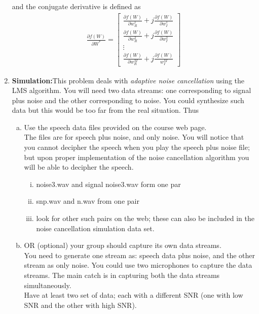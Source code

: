 \documentclass[journal,12pt,onecolumn]{IEEEtran}
\begin{document}
\begin{enumerate}
and the conjugate derivative is defined as\\
\begin{align*}
\frac{\partial{f(W)}}{\partial{W}^{*}}=\begin{bmatrix}{\frac{\partial{f(W)}}{\partial{w}_R^1}}+{j\frac{\partial{f(W)}}{\partial{w}_I^1}} \\[12pt]
{\frac{\partial{f(W)}}{\partial{w}_R^2}}+{j\frac{\partial{f(W)}}{\partial{w}_I^2}} \\
\vdots \\
{\frac{\partial{f(W)}}{\partial{w}_R^M}}+{j\frac{\partial{f(W)}}{{w}_I^M}}
\end{bmatrix}
\end{align*}
\bigskip
\item \textbf{Simulation:}This problem deals with \textit{adaptive noise cancellation} using the LMS algorithm. You will need two data streams: one corresponding to signal plus noise and the other corresponding to noise. You could synthesize such
data but this would be too far from the real situation. Thus
\medskip
\begin{enumerate}[(a)]
\item Use the speech data files provided on the course web page.\\
\smallskip
The files are for speech plus noise, and only noise. You will notice that you cannot decipher the speech when you play the speech plus noise file; but upon proper implementation of the noise cancellation algorithm you will be able to decipher the speech.
\begin{enumerate}[i.]
\medskip
\item noise3.wav and signal noise3.wav form one par
\item snp.wav and n.wav from one pair
\item look for other such pairs on the web; these can also be included in the noise cancellation simulation data
set.
\end{enumerate}
\bigskip
\item OR (optional) your group should capture its own data streams.\\
You need to generate one stream as: speech data plus noise, and the other stream as only noise. You could
use two microphones to capture the data streams. The main catch is in capturing both the data streams simultaneously.\\
Have at least two set of data; each with a different SNR (one with low SNR and the other with high SNR).
\end{enumerate}
\end{enumerate}
\end{document}
